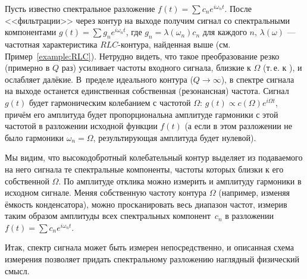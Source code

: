 Пусть известно спектральное разложение $f(t)=\sum c_n e^{i\omega_n t}$.
После <<фильтрации>> через контур на выходе получим сигнал со
спектральными компонентами $g(t)=\sum g_n e^{i\omega_n t}$,
где $g_n = \lambda(\omega_n) c_n$ для каждого $n$,
$\lambda(\omega)$ --- частотная характеристика $RLC$-контура, найденная
выше (см. Пример~\ref{example:RLC}). Нетрудно видеть, что такое преобразование резко
(примерно в $Q$ раз) усиливает частоты входного сигнала, близкие к
$\Omega$ (т.\,е. к ), и ослабляет далёкие.
В~пределе идеального контура ($Q\to \infty$), в спектре сигнала на выходе
останется единственная собственная (резонансная) частота.
Сигнал $g(t)$ будет гармоническим колебанием с частотой $\Omega$:
$g(t) \propto c(\Omega) e^{i\Omega t}$,
причём его амплитуда будет пропорциональна амплитуде гармоники с этой
частотой в разложении исходной функции $f(t)$ (а если в этом разложении не было
гармоники $\omega_n=\Omega$, результирующая амплитуда будет нулевой).

Мы видим, что высокодобротный колебательный контур 
выделяет из подаваемого
на него сигнала те спектральные компоненты, частоты которых близки к
его собственной $\Omega$. По амплитуде отклика можно измерить и амплитуду
гармоники в исходном сигнале. Меняя собственную частоту контура $\Omega$
(например, изменяя ёмкость конденсатора), можно просканировать весь
диапазон частот, измерив таким образом амплитуды всех спектральных
компонент~$c_n$ в разложении $f(t)=\sum c_n e^{i\omega_n t}$. 

Итак,
спектр сигнала может быть измерен непосредственно, и описанная схема измерения
позволяет придать спектральному разложению наглядный физический смысл.

